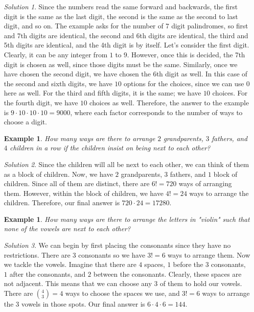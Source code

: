 \documentclass[letterpaper]{article}
\newtheorem{example}[thm]{Example}
\theoremstyle{remark}
\newtheorem*{solution}{Solution}
\theoremstyle{definition}
\begin{document}
\begin{solution}
Since the numbers read the same forward and backwards, the first digit is the same as the last digit, the second is the same as the second to last digit, and so on. The example asks for the number of $7$ digit palindromes, so first and 7th digits are identical, the second and 6th digits are identical, the third and 5th digits are identical, and the 4th digit is by itself. Let's consider the first digit. Clearly, it can be any integer from $1$ to $9$. However, once this is decided, the 7th digit is chosen as well, since those digits must be the same. Similarly, once we have chosen the second digit, we have chosen the 6th digit as well. In this case of the second and sixth digits, we have $10$ options for the choices, since we can use $0$ here as well. For the third and fifth digits, it is the same; we have $10$ choices. For the fourth digit, we have $10$ choices as well. Therefore, the answer to the example is $9\cdot 10\cdot 10 \cdot 10=9000$, where each factor corresponds to the number of ways to choose a digit.
\end{solution}

\bigskip

\begin{example}
How many ways are there to arrange $2$ grandparents, $3$ fathers, and $4$ children in a row if the children insist on being next to each other?
\end{example}

\begin{solution}
Since the children will all be next to each other, we can think of them as a block of children. Now, we have $2$ grandparents, $3$ fathers, and $1$ block of children. Since all of them are distinct, there are $6!=720$ ways of arranging them. However, within the block of children, we have $4!=24$ ways to arrange the children. Therefore, our final answer is $720\cdot 24=17280.$
\end{solution}

\bigskip

\begin{example}
How many ways are there to arrange the letters in "violin" such that none of the vowels are next to each other?
\end{example}

\begin{solution}
We can begin by first placing the consonants since they have no restrictions. There are $3$ consonants so we have $3!=6$ ways to arrange them. Now we tackle the vowels. Imagine that there are $4$ spaces, $1$ before the $3$ consonants, $1$ after the consonants, and $2$ between the consonants. Clearly, these spaces are not adjacent. This means that we can choose any $3$ of them to hold our vowels. There are $\binom{4}{3}=4$ ways to choose the spaces we use, and $3!=6$ ways to arrange the $3$ vowels in those spots. Our final answer is $6\cdot 4\cdot 6=144$.
\end{solution}
\end{document}
